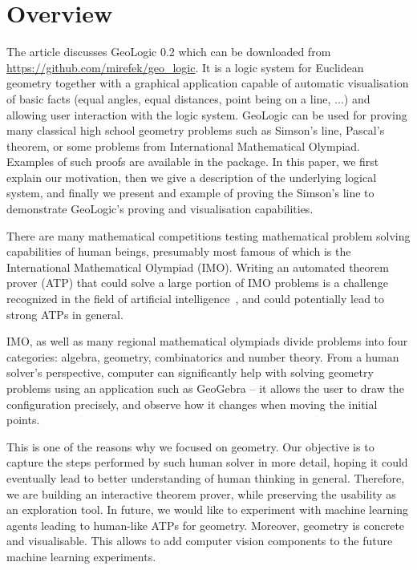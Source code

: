 \documentclass[runningheads]{llncs}
\begin{document}
\section{Overview}

The article discusses GeoLogic 0.2 which can be downloaded from
\url{https://github.com/mirefek/geo_logic}. It is a logic system for
Euclidean geometry together with a graphical application capable of
automatic visualisation of basic facts (equal angles, equal distances,
point being on a line, ...) and allowing user interaction with the
logic system. GeoLogic can be used for proving many classical high
school geometry problems such as Simson's line, Pascal's theorem, or
some problems from International Mathematical Olympiad. Examples of
such proofs are available in the package. In this paper, we first
explain our motivation, then we give a description of the underlying
logical system, and finally we present and example of proving the
Simson's line to demonstrate GeoLogic's proving and visualisation
capabilities.

There are many mathematical competitions testing mathematical problem
solving capabilities of human beings, presumably most famous of which
is the International Mathematical Olympiad (IMO). Writing an automated
theorem prover (ATP) that could solve a large portion of IMO problems is a
challenge recognized in the field of artificial
intelligence~\cite{IMO-Challenge}, and could potentially lead to
strong ATPs in general.

IMO, as well as many regional mathematical olympiads divide problems
into four categories: algebra, geometry, combinatorics and number theory.
From a human solver's perspective, computer can significantly help
with solving geometry problems using an application such as GeoGebra --
it allows the user to draw the configuration precisely, and observe
how it changes when moving the initial points.

This is one of the reasons why we focused on geometry.
Our objective is to capture the steps performed by such human solver
in more detail, hoping it could eventually lead to better
understanding of human thinking in general.
Therefore, we are building an interactive
theorem prover, while preserving the usability as an exploration
tool. In future, we would like to experiment with machine learning
agents leading to human-like ATPs for geometry. Moreover, geometry is
concrete and visualisable. This allows to add computer vision
components to the future machine learning experiments.
\end{document}
